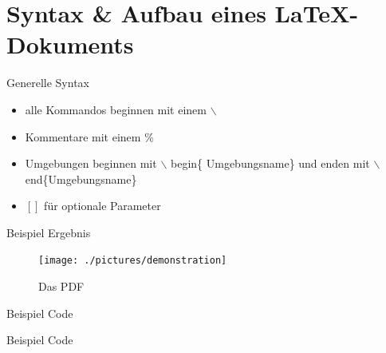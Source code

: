 \section{Syntax \& Aufbau eines \LaTeX -Dokuments}
%
\begin{frame}{Generelle Syntax}
	\begin{itemize}[<+->]
		\item alle Kommandos beginnen mit einem $\backslash$
		\item Kommentare mit einem \%
		\item Umgebungen beginnen mit $\backslash$ begin\{ Umgebungsname\} und enden mit $\backslash$ end\{Umgebungsname\}
		\item $\left[ \right]$ für optionale Parameter
	\end{itemize}
\end{frame}

\begin{frame}[fragile]{Beispiel Ergebnis}
	\begin{figure}[tbph]
	\centering
	\texttt{[image: ./pictures/demonstration]}
	\caption{Das PDF}
	\label{fig:demonstration}
	\end{figure}
\end{frame}

\begin{frame}[fragile]{Beispiel Code}
	\begin{Code}
	\centering
		\begin{minipage}{0.9\textwidth}
	
		
	
		\end{minipage}
	\end{Code}

\end{frame}
\begin{frame}[fragile]{Beispiel Code}
	\lstsettex
	\begin{Code}
	\centering
		\begin{minipage}{0.9\textwidth}
		
		\end{minipage}
	\end{Code}

\end{frame}



